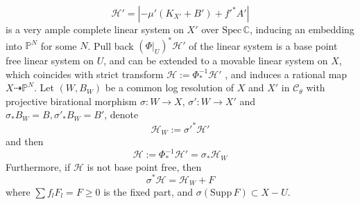 \documentclass{article}
\begin{document}
\[ \mathcal{H}'=|-\mu' (K_{X'}+B') +f'^*A'| \]
is a very ample complete linear system on $ X' $ over $ \mathrm{Spec}\,\mathbb{C} $,  inducing an embedding into $ \mathbb{P}^N $ for some $ N $. Pull back $ (\Phi|_U)^*\mathcal{H}' $ of the linear system is a base point free linear system on $ U $, and can be extended  to a movable linear system on $ X $, which coincides with strict transform $ \mathcal{H}:=\Phi^{-1}_*\mathcal{H}' $ , and induces a rational map $ X\dashrightarrow \mathbb{P}^N $. Let $ (W,B_W) $ be a common log resolution of $ X $ and $ X' $ in $ \mathcal{C}_\theta $ with projective birational morphism $ \sigma:W\to X$,   $\sigma':W\to X' $ and $\sigma_*B_W=B, \sigma'_*B_W=B' $, denote
\[ \mathcal{H}_W:=\sigma'^*\mathcal{H}' \]
and then 
\[ \mathcal{H}:=\Phi^{-1}_*\mathcal{H}'=\sigma_*\mathcal{H}_W \]
Furthermore, if $ \mathcal{H} $ is not base point free, then
\[ \sigma^*\mathcal{H}=\mathcal{H}_W+F \]
where $ \sum f_lF_l=F\geqslant0 $ is the fixed part, and $ \sigma(\mathrm{Supp}\,F)\subset X-U $. 
\end{document}
